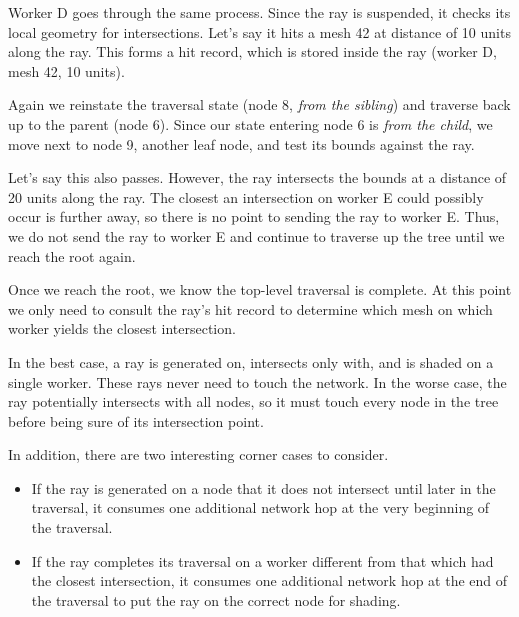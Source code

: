 \documentclass[a4paper,twoside]{article}
\begin{document}
Worker D goes through the same process. Since the ray is suspended, it checks
its local geometry for intersections. Let's say it hits a mesh 42 at distance
of 10 units along the ray. This forms a hit record, which is stored inside the
ray (worker D, mesh 42, 10 units).

Again we reinstate the traversal state (node 8, \emph{from the sibling}) and
traverse back up to the parent (node 6). Since our state entering node 6 is
\emph{from the child}, we move next to node 9, another leaf node, and test
its bounds against the ray.


Let's say this also passes. However, the ray intersects the bounds at a distance
of 20 units along the ray. The closest an intersection on worker E could
possibly occur is further away, so there is no point to sending the ray to
worker E. Thus, we do not send the ray to worker E and continue to traverse up
the tree until we reach the root again.



Once we reach the root, we know the top-level traversal is complete. At this
point we only need to consult the ray's hit record to determine which mesh on
which worker yields the closest intersection.

In the best case, a ray is generated on, intersects only with, and is shaded on
a single worker. These rays never need to touch the network. In the worse case,
the ray potentially intersects with all nodes, so it must touch every node in
the tree before being sure of its intersection point.

In addition, there are two interesting corner cases to consider.

\begin{itemize}
    \item If the ray is generated on a node that it does not intersect until
        later in the traversal, it consumes one additional network hop at the
        very beginning of the traversal.
    \item If the ray completes its traversal on a worker different from that
        which had the closest intersection, it consumes one additional network hop
        at the end of the traversal to put the ray on the correct node for
        shading.
\end{itemize}
\end{document}
